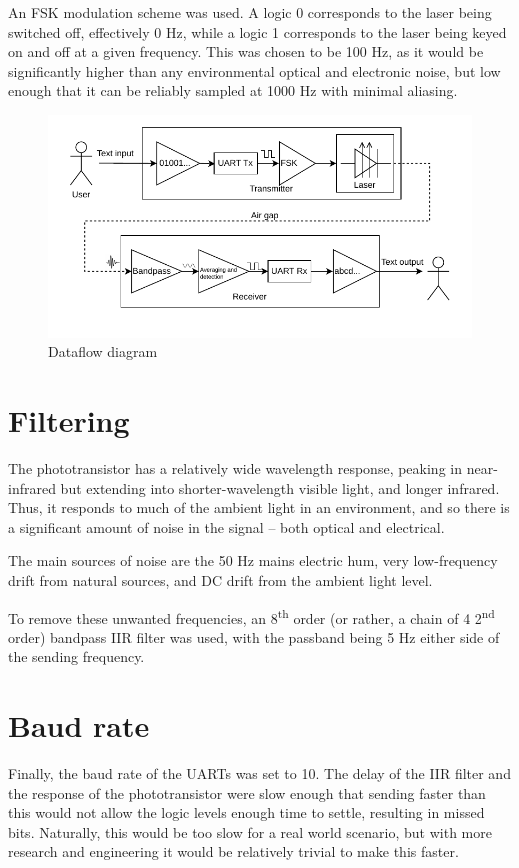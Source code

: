 \documentclass{article}
\begin{document}
\begin{multicols}{2}
An FSK modulation scheme was used. A logic 0 corresponds to the laser being switched off, effectively 0 Hz, while a logic 1 corresponds to the laser being keyed on and off at a given frequency. This was chosen to be 100 Hz, as it would be significantly higher than any environmental optical and electronic noise, but low enough that it can be reliably sampled at 1000 Hz with minimal aliasing.

\begin{figure}[H]
    \includegraphics[width=\linewidth]{figures/dataflow.pdf}
    \caption{Dataflow diagram}
    \label{fig:dataflow}
\end{figure}

\section{Filtering}
The phototransistor has a relatively wide wavelength response, peaking in near-infrared but extending into shorter-wavelength visible light, and longer infrared. Thus, it responds to much of the ambient light in an environment, and so there is a significant amount of noise in the signal -- both optical and electrical.

The main sources of noise are the 50 Hz mains electric hum, very low-frequency drift from natural sources, and DC drift from the ambient light level. 

To remove these unwanted frequencies, an 8\textsuperscript{th} order (or rather, a chain of 4 2\textsuperscript{nd} order) bandpass IIR filter was used, with the passband being 5 Hz either side of the sending frequency. 

\section{Baud rate}
Finally, the baud rate of the UARTs was set to 10. The delay of the IIR filter and the response of the phototransistor were slow enough that sending faster than this would not allow the logic levels enough time to settle, resulting in missed bits. Naturally, this would be too slow for a real world scenario, but with more research and engineering it would be relatively trivial to make this faster. 


\end{multicols}
\end{document}
